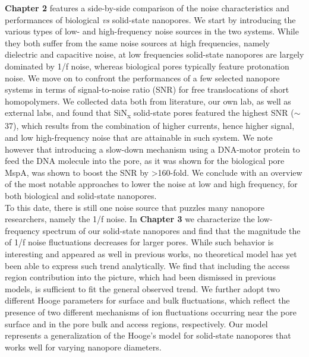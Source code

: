\noindent \textbf{Chapter 2} features a side-by-side comparison of the noise characteristics and performances of biological \emph{vs} solid-state nanopores. We start by introducing the various types of low- and high-frequency noise sources in the two systems. While they both suffer from the same noise sources at high frequencies, namely dielectric and capacitive noise, at low frequencies solid-state nanopores are largely dominated by 1/f noise, whereas biological pores typically feature protonation noise. We move on to confront the performances of a few selected nanopore systems in terms of signal-to-noise ratio (SNR) for free translocations of short homopolymers. We collected data both from literature, our own lab, as well as external labs, and found that SiN\textsubscript{x} solid-state pores featured the highest SNR ($\sim$37), which results from the combination of higher currents, hence higher signal, and low high-frequency noise that are attainable in such system. We note however that introducing a slow-down mechanism using a DNA-motor protein to feed the DNA molecule into the pore, as it was shown for the biological pore MspA, was shown to boost the SNR by >160-fold. We conclude with an overview of the most notable approaches to lower the noise at low and high frequency, for both biological and solid-state nanopores.\\[0.5pt]

\noindent To this date, there is still one noise source that puzzles many nanopore researchers, namely the 1/f noise. In \textbf{Chapter 3} we characterize the low-frequency spectrum of our solid-state nanopores and find that the magnitude the of 1/f noise fluctuations decreases for larger pores. While such behavior is interesting and appeared as well in previous works, no theoretical model has yet been able to express such trend analytically. We find that including the access region contribution into the picture, which had been dismissed in previous models, is sufficient to fit the general observed trend. We further adopt two different Hooge parameters for surface and bulk fluctuations, which reflect the presence of two different mechanisms of ion fluctuations occurring near the pore surface and in the pore bulk and access regions, respectively. Our model represents a generalization of the Hooge's model for solid-state nanopores that works well for varying nanopore diameters. \\[0.5pt]

